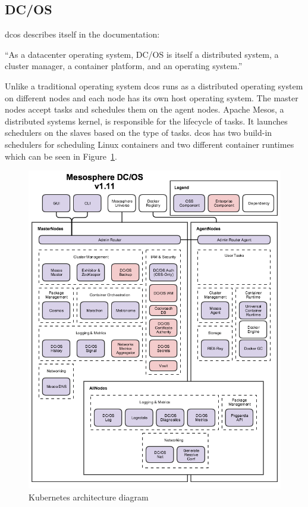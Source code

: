 \subsection{DC/OS}
\Gls{dcos} describes itself in the documentation\cite{dcos_what}: 
\begin{displayquote}
``As a datacenter operating system, DC/OS is itself a distributed system, a cluster manager, a container platform, and an operating system.''
\end{displayquote} 
Unlike a traditional operating system \gls{dcos} runs as a distributed operating system on different nodes and each node has its own host operating system. The master nodes accept tasks and schedules them on the agent nodes. Apache Mesos\cite{apache_mesos}, a distributed systems kernel, is responsible for the lifecycle of tasks. It launches schedulers on the slaves based on the type of tasks. \Gls{dcos} has two build-in schedulers for scheduling Linux containers and two different container runtimes which can be seen in Figure~\ref{fig:dcos-arch}.

\begin{figure}
    \centering
    \includegraphics[width=0.8\columnwidth]{images/dcos-arch}
    \caption{Kubernetes architecture diagram\cite{dcos_arch}}
    \label{fig:dcos-arch}
\end{figure}

